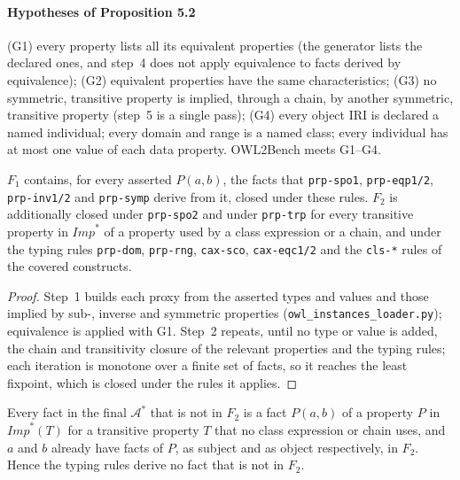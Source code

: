 \paragraph{Hypotheses of Proposition 5.2} (G1) every property lists all its equivalent properties
(the generator lists the declared ones, and step~4 does not apply equivalence to facts derived by
equivalence); (G2) equivalent properties have the same characteristics; (G3) no symmetric,
transitive property is implied, through a chain, by another symmetric, transitive property
(step~5 is a single pass); (G4) every object IRI is declared a named individual; every domain and
range is a named class; every individual has at most one value of each data property. OWL2Bench
meets G1--G4.

\begin{lemma}
\label{lem:step12}
$F_1$ contains, for every asserted $P(a,b)$, the facts that \texttt{prp-spo1}, \texttt{prp-eqp1/2},
\texttt{prp-inv1/2} and \texttt{prp-symp} derive from it, closed under these rules. $F_2$ is
additionally closed under \texttt{prp-spo2} and under \texttt{prp-trp} for every transitive
property in $\mathit{Imp}^*$ of a property used by a class expression or a chain, and under the
typing rules \texttt{prp-dom}, \texttt{prp-rng}, \texttt{cax-sco}, \texttt{cax-eqc1/2} and the
\texttt{cls-*} rules of the covered constructs.
\end{lemma}

\begin{proof}
Step~1 builds each proxy from the asserted types and values and those implied by sub-, inverse
and symmetric properties (\texttt{owl\_instances\_loader.py}); equivalence is applied with G1.
Step~2 repeats, until no type or value is added, the chain and transitivity closure of the
relevant properties and the typing rules; each iteration is monotone over a finite set of
facts, so it reaches the least fixpoint, which is closed under the rules it applies.
\end{proof}

\begin{lemma}
\label{lem:typing}
Every fact in the final $\mathcal{A}^*$ that is not in $F_2$ is a fact $P(a,b)$ of a property $P$
in $\mathit{Imp}^*(T)$ for a transitive property $T$ that no class expression or chain uses, and
$a$ and $b$ already have facts of $P$, as subject and as object respectively, in $F_2$. Hence the
typing rules derive no fact that is not in $F_2$.
\end{lemma}

